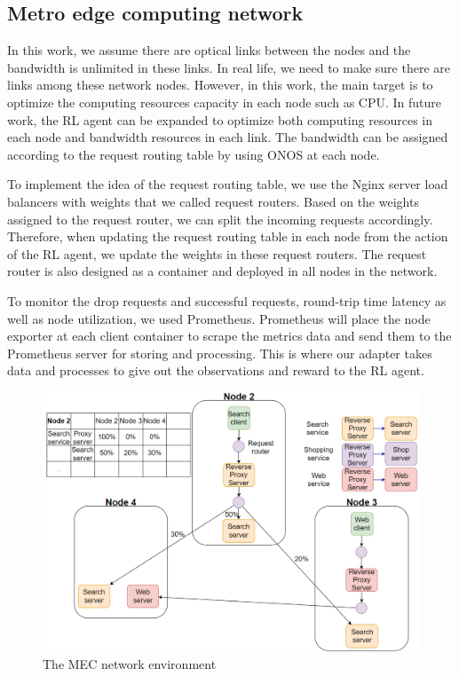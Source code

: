 \documentclass[conference]{IEEEtran}
\begin{document}
\subsection{Metro edge computing network}

In this work, we assume there are optical links between the nodes and the bandwidth is unlimited in these links. In real life, we need to make sure there are links among these network nodes. However, in this work, the main target is to optimize the computing resources capacity in each node such as CPU. In future work, the RL agent can be expanded to optimize both computing resources in each node and bandwidth resources in each link. The bandwidth can be assigned according to the request routing table by using ONOS at each node.

To implement the idea of the request routing table, we use the Nginx server load balancers with weights that we called request routers. Based on the weights assigned to the request router, we can split the incoming requests accordingly. Therefore, when updating the request routing table in each node from the action of the RL agent, we update the weights in these request routers. The request router is also designed as a container and deployed in all nodes in the network. 

To monitor the drop requests and successful requests, round-trip time latency as well as node utilization, we used Prometheus. Prometheus will place the node exporter at each client container to scrape the metrics data and send them to the Prometheus server for storing and processing. This is where our adapter takes data and processes to give out the observations and reward to the RL agent. 

\begin{figure}[]
    \centering
    \includegraphics[scale = 0.28]{imgs/metro_network_env_client_services_router.png}
    \caption{The MEC network environment}
    \label{fig:metro_network_env_client_services_router}
\end{figure}
\end{document}
